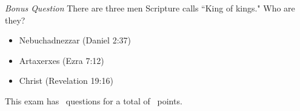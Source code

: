 \documentclass[11pt,addpoints]{exam}   	%
\begin{document}
\begin{questions}
\bonusquestion \emph{Bonus Question} There are three men Scripture calls ``King of kings." Who are they?
\begin{solution}
\begin{itemize}
\item Nebuchadnezzar (Daniel 2:37)
\item Artaxerxes (Ezra 7:12)
\item Christ (Revelation 19:16)
\end{itemize}
\end{solution}

\end{questions}

\begin{center}
This exam has \numquestions\ questions for a total of \numpoints\ points.
\end{center}

\pagebreak
\end{document}
